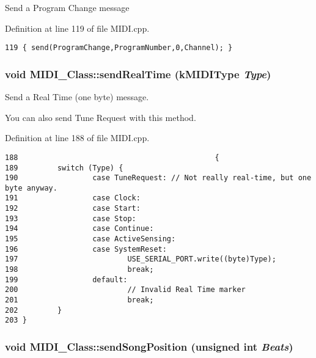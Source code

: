 Send a Program Change message 

Definition at line 119 of file MIDI.cpp.

\begin{Code}\begin{verbatim}119 { send(ProgramChange,ProgramNumber,0,Channel); }
\end{verbatim}
\end{Code}


\hypertarget{class_m_i_d_i___class_e9086dd31c41ea773925a069dbd0080b}{
\subsubsection[{sendRealTime}]{\setlength{\rightskip}{0pt plus 5cm}void MIDI\_\-Class::sendRealTime ({\bf kMIDIType} {\em Type})}}
\label{class_m_i_d_i___class_e9086dd31c41ea773925a069dbd0080b}


Send a Real Time (one byte) message. \par
 You can also send Tune Request with this method. 

Definition at line 188 of file MIDI.cpp.

\begin{Code}\begin{verbatim}188                                             {
189         switch (Type) {
190                 case TuneRequest: // Not really real-time, but one byte anyway.
191                 case Clock:
192                 case Start:
193                 case Stop:      
194                 case Continue:
195                 case ActiveSensing:
196                 case SystemReset:
197                         USE_SERIAL_PORT.write((byte)Type);
198                         break;
199                 default:
200                         // Invalid Real Time marker
201                         break;
202         }
203 }
\end{verbatim}
\end{Code}


\hypertarget{class_m_i_d_i___class_0b9a6c3437016b8dc9678d6c43ca693f}{
\subsubsection[{sendSongPosition}]{\setlength{\rightskip}{0pt plus 5cm}void MIDI\_\-Class::sendSongPosition (unsigned int {\em Beats})}}
\label{class_m_i_d_i___class_0b9a6c3437016b8dc9678d6c43ca693f}




